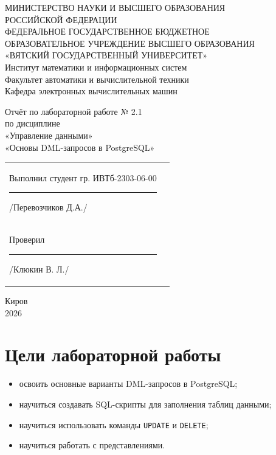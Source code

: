 \documentclass[oneside,a4paper,14pt]{extarticle}
\begin{document}
\newpage\thispagestyle{empty}

\begin{center}
МИНИСТЕРСТВО НАУКИ И ВЫСШЕГО ОБРАЗОВАНИЯ\\
РОССИЙСКОЙ ФЕДЕРАЦИИ\\
ФЕДЕРАЛЬНОЕ ГОСУДАРСТВЕННОЕ БЮДЖЕТНОЕ\\
ОБРАЗОВАТЕЛЬНОЕ УЧРЕЖДЕНИЕ ВЫСШЕГО ОБРАЗОВАНИЯ\\
«ВЯТСКИЙ ГОСУДАРСТВЕННЫЙ УНИВЕРСИТЕТ»\\
Институт математики и информационных систем\\
Факультет автоматики и вычислительной техники\\
Кафедра электронных вычислительных машин
\end{center}

\vspace{30mm}

\begin{center}
Отчёт по лабораторной работе № 2.1\\
по дисциплине\\
«Управление данными»\\
«Основы DML-запросов в PostgreSQL»
\end{center}

\vspace{40mm}

\noindent
\begin{tabular}{l r}
Выполнил студент гр. ИВТб-2303-06-00 \hspace{3mm}\rule[-1mm]{20mm}{0.15mm} /Перевозчиков Д.А./ \\

Проверил \hspace{57mm}\rule[-1mm]{20mm}{0.15mm} /Клюкин В. Л./
\end{tabular}

\vfill
\begin{center}
Киров\\
2026
\end{center}

\newpage\thispagestyle{empty}

\section{Цели лабораторной работы}

\begin{itemize}
    \item освоить основные варианты DML-запросов в PostgreSQL;
    \item научиться создавать SQL-скрипты для заполнения таблиц данными;
    \item научиться использовать команды \texttt{UPDATE} и \texttt{DELETE};
    \item научиться работать с представлениями.
\end{itemize}
\end{document}
